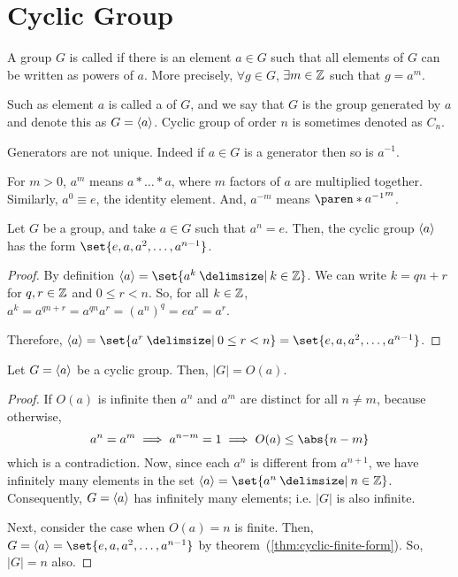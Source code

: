 \documentclass[11pt]{penrose}
\begin{document}
\section{Cyclic Group}
\begin{ndfn}
    A group $G$ is called  if there is an element $a \in G$ such that all elements of $G$ can be written as powers of $a$. More precisely, $\forall g \in G$, $\exists m \in \mathbb{Z}$ such that $g = a^m$.

    Such as element $a$ is called a  of $G$, and we say that $G$ is the group generated by $a$ and denote this as $G = \langle a\rangle$. Cyclic group of order $n$ is sometimes denoted as $C_n$.
\end{ndfn}

Generators are not unique. Indeed if $a \in G$ is a generator then so is $a^{-1}$.

\begin{notation}
    For $m > 0$, $a^m$ means $a * \dots * a$, where $m$ factors of $a$ are multiplied together. Similarly, $a^0 \equiv e$, the identity element. And, $a^{-m}$ means $\paren*{a^{-1}}^m$.
\end{notation}

\begin{nthm}\label{thm:cyclic-finite-form}
    Let $G$ be a group, and take $a \in G$ such that $a^n = e$. Then, the cyclic group $\langle a\rangle$ has the form $\set{e, a, a^2, \dots, a^{n-1}}$.
\end{nthm}
\begin{proof}
    By definition $\cyclic{a} = \set{a^k \st k \in \Z}$. We can write $k = qn + r$ for $q, r \in \mathbb{Z}$ and $0 \leq r < n$. So, for all $k \in \mathbb{Z}$, $a^k = a^{qn+r} = a^{qn} a^r = (a^{n})^{q} = e a^r = a^r$.

    Therefore, $\cyclic{a} = \set{a^r \st 0 \leq r < n} = \set{e, a, a^2, \dots, a^{n-1}}$.
\end{proof}

\begin{nthm}\label{thm:cyclic-group-order}
    Let $G = \langle a\rangle$ be a cyclic group. Then, $|G| = O(a)$.
\end{nthm}
\begin{proof}
    If $O(a)$ is infinite then $a^n$ and $a^m$ are distinct for all $n \neq m$, because otherwise,
    \begin{equation*}
        a^n = a^m \implies a^{n - m} = 1 \implies O(a) \leq \abs{n-m}
    \end{equation*}
    which is a contradiction. Now, since each $a^n$ is different from $a^{n+1}$, we have infinitely many elements in the set $\cyclic{a} = \set{a^n \st n \in \Z}$. Consequently, $G = \langle a\rangle$ has infinitely many elements; i.e. $|G|$ is also infinite.

    Next, consider the case when $O(a) = n$ is finite. Then, $G = \cyclic{a} = \set{e, a, a^2, \dots, a^{n-1}}$ by theorem~(\ref{thm:cyclic-finite-form}). So, $|G| = n$ also.
\end{proof}
\end{document}
